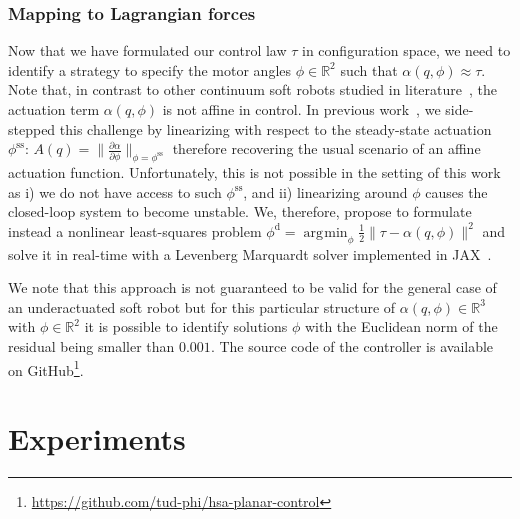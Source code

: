 \documentclass[letterpaper, 10pt, conference]{ieeeconf}      %
\DeclareMathOperator*{\argmin}{arg\!\min}
\begin{document}
\subsubsection{Mapping to Lagrangian forces}
%
Now that we have formulated our control law $\tau$ in configuration space, we need to identify a strategy to specify the motor angles $\phi \in \mathbb{R}^2$ such that $\alpha(q,\phi) \approx \tau$. Note that, in contrast to other continuum soft robots studied in literature~\cite{della2023model}, the actuation term $\alpha(q,\phi)$ is not affine in control. %
In previous work~\cite{stolzle2023experimental}, we side-stepped this challenge by linearizing with respect to the steady-state actuation $\phi^\mathrm{ss}$: $A(q) = \lVert \frac{\partial \alpha}{\partial \phi}\rVert_{\phi=\phi^\mathrm{ss}}$ therefore recovering the usual scenario of an affine actuation function. Unfortunately, this is not possible in the setting of this work as i) we do not have access to such $\phi^\mathrm{ss}$, and ii) linearizing around $\phi$ causes the closed-loop system to become unstable. We, therefore, propose to formulate instead a nonlinear least-squares problem $\phi^\mathrm{d} = \argmin_\phi \frac{1}{2} \lVert \tau - \alpha(q,\phi) \rVert^2$ and solve it in real-time with a Levenberg Marquardt solver implemented in JAX~\cite{jaxopt_implicit_diff}.

We note that this approach is not guaranteed to be valid for the general case of an underactuated soft robot but for this particular structure of $\alpha(q,\phi) \in \mathbb{R}^3$ with $\phi \in \mathbb{R}^2$ it is possible to identify solutions $\phi$ with the Euclidean norm of the residual being smaller than $0.001$.
The source code of the controller is available on GitHub\footnote{\url{https://github.com/tud-phi/hsa-planar-control}}.


\section{Experiments}
\end{document}
